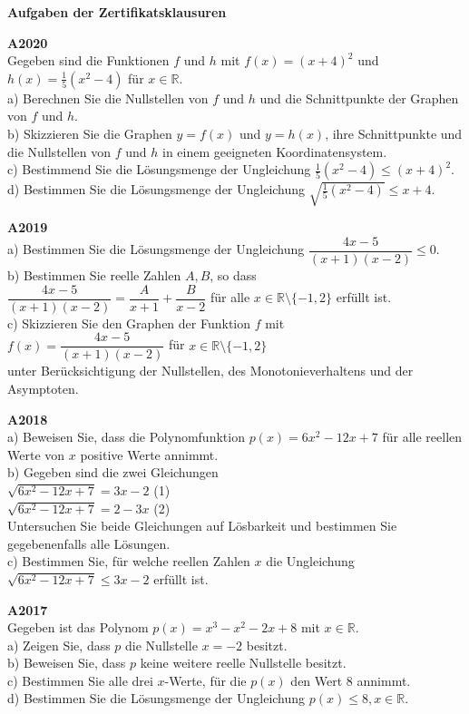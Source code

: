 \documentclass[landscape,twocolumn,a4paper]{article}
\begin{document}
\parindent 0mm


\textbf{Aufgaben der Zertifikatsklausuren}
\bigskip 

\textbf{A2020} \\
Gegeben sind die Funktionen $f$ und $h$ mit $f(x)=(x+4)^2$ und $h(x)= \frac{1}{5}(x^2-4)$ für $x \in \mathbb{R}$. \\
a) Berechnen Sie die Nullstellen von $f$ und $h$ und die Schnittpunkte der Graphen von $f$ und $h$. \\
b) Skizzieren Sie die Graphen $y = f(x)$ und $y=h(x)$, ihre Schnittpunkte und die Nullstellen von $f$ und $h$ in
einem geeigneten Koordinatensystem. \\
c) Bestimmend Sie die Lösungsmenge der Ungleichung $\frac {1}{5}(x^2-4) \le (x+4)^2$. \\
d) Bestimmen Sie die Lösungsmenge der Ungleichung $\sqrt{\frac {1}{5}(x^2-4)} \le x+4$.
\bigskip

\textbf{A2019} \\
a) Bestimmen Sie die Lösungsmenge der Ungleichung $\dfrac{4x-5}{(x+1)(x-2)} \le 0$. \\
b) Bestimmen Sie reelle Zahlen $A, B$, so dass \\
$\dfrac{4x-5}{(x+1) (x-2)} = \dfrac{A}{x+1} + \dfrac{B}{x-2}$ für alle $x \in \mathbb{R} \setminus \{-1,2\}$
erfüllt ist. \\
c) Skizzieren Sie den Graphen der Funktion $f$ mit \\
$f(x) = \dfrac{4x-5}{(x+1) (x-2)} $ für $x \in \mathbb{R} \setminus \{-1,2\}$ \\
unter Berücksichtigung der Nullstellen, des Monotonieverhaltens und der Asymptoten.
\bigskip

\textbf{A2018} \\
a) Beweisen Sie, dass die Polynomfunktion $p(x) = 6x^2-12x+7$ für alle reellen Werte von $x$ 
positive Werte annimmt. \\
b) Gegeben sind die zwei Gleichungen \\
\quad $\sqrt{6x^2-12x+7} = 3x-2$ \quad (1) \\
\quad $\sqrt{6x^2-12x+7} = 2-3x$ \quad (2) \\
Untersuchen Sie beide Gleichungen auf Lösbarkeit und bestimmen Sie gegebenenfalls alle Lösungen. \\
c) Bestimmen Sie, für welche reellen Zahlen $x$ die Ungleichung \\
 $\sqrt{6x^2-12x+7} \le 3x-2$ erfüllt ist.
\bigskip

\textbf{A2017} \\
Gegeben ist das Polynom $p(x) = x^3-x^2 -2x+8$ mit $x \in \mathbb{R}$. \\
a) Zeigen Sie, dass $p$ die Nullstelle $x = -2$ besitzt. \\
b) Beweisen Sie, dass $p$ keine weitere reelle Nullstelle besitzt. \\
c) Bestimmen Sie alle drei $x$-Werte, für die $p(x)$ den Wert 8 annimmt. \\
d) Bestimmen Sie die Lösungsmenge der Ungleichung $p(x) \le 8, x \in \mathbb{R}$.
\bigskip
\end{document}
